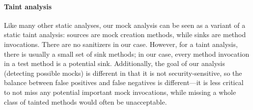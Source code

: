 \paragraph{Taint analysis} Like many other static analyses, our mock analysis can be seen as a variant of a static taint analysis: sources are mock creation methods, while sinks are method invocations. There are no sanitizers in our case. However, for a taint analysis, there is usually a small set of sink methods; in our case, every method invocation in a test method is a potential sink. Additionally, the goal of our analysis (detecting possible mocks) is different in that it is not security-sensitive, so the balance between false positives and false negatives is different---it is less critical to not miss any potential important mock invocations, while missing a whole class of tainted methods would often be unacceptable.


